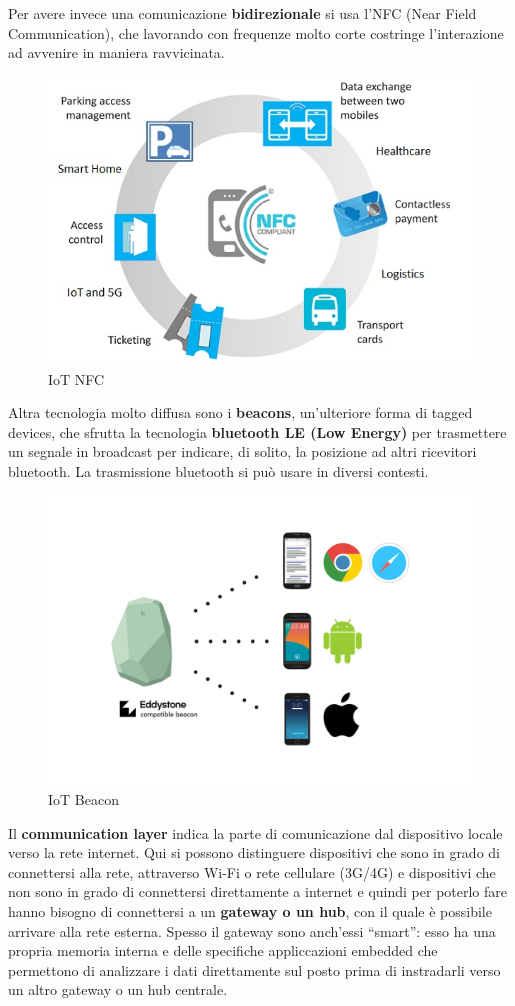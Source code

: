 \documentclass[10pt,a4paper,oneside]{scrbook}
\begin{document}
Per avere invece una comunicazione \textbf{bidirezionale} si usa l'NFC (Near Field Communication), che lavorando con frequenze molto corte costringe 
l'interazione ad avvenire in maniera ravvicinata.
\begin{figure}[h]
    \centering
    \includegraphics[width=0.6\linewidth]{img/NFC-applicatioins.jpg}
    \caption{IoT NFC}
    \label{fig:NFC}
\end{figure}
\pagebreak

Altra tecnologia molto diffusa sono i \textbf{beacons}, un'ulteriore forma di tagged devices, che sfrutta la tecnologia \textbf{bluetooth LE (Low Energy)}
per trasmettere un segnale in broadcast per indicare, di solito, la posizione ad altri ricevitori bluetooth. La trasmissione bluetooth si può usare in diversi contesti.
\begin{figure}[h]
    \centering
    \includegraphics[width=0.6\linewidth]{img/eddystone.png}
    \caption{IoT Beacon}
    \label{fig:Beacon}
\end{figure}

Il \textbf{communication layer} indica la parte di comunicazione dal dispositivo locale verso la rete internet.
Qui si possono distinguere dispositivi che sono in grado di connettersi alla rete, attraverso Wi-Fi o rete cellulare (3G/4G) e dispositivi che non sono 
in grado di connettersi direttamente a internet e quindi per poterlo fare hanno bisogno di connettersi a un \textbf{gateway o un hub}, con il quale è possibile 
arrivare alla rete esterna. Spesso il gateway sono anch'essi ``smart'': esso ha una propria memoria interna e delle specifiche appliccazioni embedded che 
permettono di analizzare i dati direttamente sul posto prima di instradarli verso un altro gateway o un hub centrale.
\end{document}
